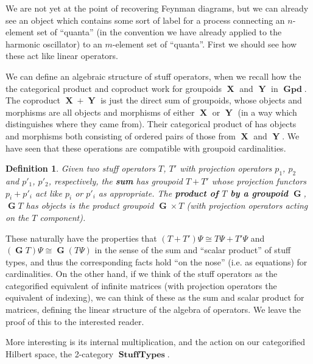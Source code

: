 \documentclass{amsart} \usepackage{amsmath,amssymb,bbm}
\newcommand{\opname}[1]{\operatorname{#1}}
\newtheorem{definition}{Definition}
\newcommand{\catname}[1]{\boldsymbol{\opname{{#1}}}}
\begin{document}
We are not yet at the point of recovering Feynman diagrams, but we can
already see an object which contains some sort of label for a process
connecting an $n$-element set of ``quanta'' (in the convention we have
already applied to the harmonic oscillator) to an $m$-element set of
``quanta''.  First we should see how these act like linear operators.

We can define an algebraic structure of stuff operators, when we
recall how the the categorical product and coproduct work for
groupoids $\catname{X}$ and $\catname{Y}$ in $\catname{Gpd}$.  The
coproduct $\catname{X} + \catname{Y}$ is just the direct sum of
groupoids, whose objects and morphisms are all objects and morphisms
of either $\catname{X}$ or $\catname{Y}$ (in a way which distinguishes
where they came from).  Their categorical product of has objects and
morphisms both consisting of ordered pairs of those from $\catname{X}$
and $\catname{Y}$.  We have seen that these operations are compatible
with groupoid cardinalities.

\begin{definition} Given two stuff operators $T$, $T'$ with projection
operators $p_1$, $p_2$ and $p'_1$, $p'_2$, respectively, the \textbf{sum} has
groupoid $T + T'$ whose projection functors $p_i + p'_i$ act like $p_i$
or $p'_i$ as appropriate.  The \textbf{product of $T$ by a groupoid} $\catname{G}$,
$\catname{G}T$ has objects is the product groupoid $\catname{G} \times
T$ (with projection operators acting on the $T$ component).
\end{definition}

These naturally have the properties that $(T + T')\Psi \cong T\Psi +
T'\Psi$ and $(\catname{G}T)\Psi \cong \catname{G}(T\Psi)$ in the sense
of the sum and ``scalar product'' of stuff types, and thus the
corresponding facts hold ``on the nose'' (i.e. as equations) for
cardinalities.  On the other hand, if we think of the stuff operators
as the categorified equivalent of infinite matrices (with projection
operators the equivalent of indexing), we can think of these as the
sum and scalar product for matrices, defining the linear structure of
the algebra of operators.  We leave the proof of this to the
interested reader.

More interesting is its internal multiplication, and the action on our
categorified Hilbert space, the 2-category $\catname{StuffTypes}$.
\end{document}
